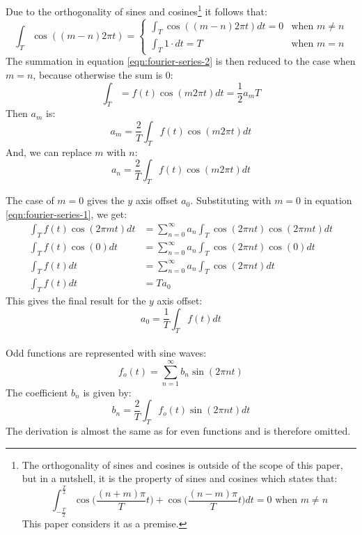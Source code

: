 \documentclass{article}
\begin{document}
Due to the orthogonality of sines and cosines\footnote{The orthogonality of 
	sines and cosines is outside of the scope of this paper, but in a nutshell,
	it is the property of sines and cosines which states that:
	\[
		\int_{-\frac{T}{2}}^{\frac{T}{2}} \cos \bigg(\frac{(n + m) \pi}{T} t
		\bigg) + \cos \bigg(\frac{(n - m) \pi}{T} t \bigg) dt = 0 \text{ when }
		m \neq n
	\]
This paper considers it as a premise.} it follows that:
\[
	\int_{T} \cos( (m - n) 2 \pi t) = 
	\begin{cases}
		\int_{T} \cos ( (m -n) 2 \pi t) dt = 0 & \text{when } m \neq n \\
		\int_{T} 1 \cdot dt = T & \text{when } m = n
	\end{cases}
\]
The summation in equation \ref{eqn:fourier-series-2} is then reduced to the case
when $m = n$, because otherwise the sum is $0$:
$$\int_T = f(t) \cos(m 2 \pi t) dt = \frac{1}{2} a_m T$$
Then $a_m$ is:
\begin{equation*}
	a_m = \frac{2}{T} \int_T f(t) \cos(m 2 \pi t) dt
\end{equation*}
And, we can replace $m$ with $n$:
\begin{equation}
	a_n = \frac{2}{T} \int_T f(t) \cos(m 2 \pi t) dt
	\label{eqn:fourier-series-amp}
\end{equation}

The case of $m = 0$ gives the $y$ axis offset $a_0$. Substituting with $m = 0$
in equation \ref{eqn:fourier-series-1}, we get:
$$
\begin{aligned}
\int_{T} f(t) \cos(2 \pi m t) dt &= 
\sum^{\infty}_{n=0} a_n \int_{T} \cos(2 \pi n t) \cos(2 \pi m t) dt \\ 
\int_T f(t) \cos(0) dt &= \sum^{\infty}_{n=0} a_n \int_T \cos(2 \pi n t) \cos(0) dt \\
\int_T f(t) dt &= \sum^{\infty}_{n=0} a_n \int_T \cos(2 \pi n t) dt \\
\int_T f(t) dt &= T a_0
\end{aligned}$$
This gives the final result for the $y$ axis offset:
\begin{equation}
	a_0 = \frac{1}{T} \int_T f(t) dt
	\label{eqn:fourier-series-yoffset}
\end{equation}

\paragraph*{}
Odd functions are represented with sine waves:
$$f_o(t) = \sum^{\infty}_{n=1} b_n \sin(2 \pi n t)$$
The coefficient $b_n$ is given by:
$$b_n = \frac{2}{T}\int_T f_o(t) \sin(2 \pi n t) dt$$
The derivation is almost the same as for even functions and is therefore
omitted.
\end{document}
